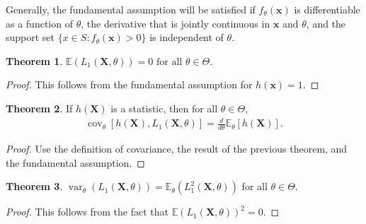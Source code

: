 \documentclass[a4paper,12pt]{article}
\theoremstyle{definition}
\newtheorem{theorem}{Theorem}[section]
\theoremstyle{definition}
\theoremstyle{definition}
\newcommand{\bs}{\boldsymbol}
\newcommand{\var}{\operatorname{var}}
\newcommand{\cov}{\operatorname{cov}}
\begin{document}
    Generally, the fundamental assumption will be satisfied if $f_\theta(\bs{x})$ is differentiable as a function of $\theta$, the derivative that is jointly continuous in $\bs{x}$ and $\theta$, and the support set $\{ x \in S : f_\theta(\bs{x}) > 0 \}$ is independent of $\theta$.
    \begin{theorem}
        $\mathbb{E}(L_1(\bs{X}, \theta)) = 0 \text{ for all } \theta \in \Theta$.
        \begin{proof}
            This follows from the fundamental assumption for $h(\bs{x}) = 1$.
        \end{proof}
    \end{theorem}
    \begin{theorem}
        If $h(\bs{X})$ is a statistic, then for all $\theta \in \Theta$,
        \begin{align*}
            \cov_\theta[h(\bs{X}), L_1(\bs{X}, \theta)] = \frac{d}{d\theta} \mathbb{E}_\theta[h(\bs{X})].
        \end{align*}
        \begin{proof}
            Use the definition of covariance, the result of the previous theorem, and the fundamental assumption.
        \end{proof}
    \end{theorem}
    \begin{theorem}
        $\var_\theta(L_1(\bs{X}, \theta)) = \mathbb{E}_\theta \left( L_1^2 (\bs{X}, \theta) \right)$ for all $\theta \in \Theta$.
        \begin{proof}
            This follows from the fact that $\mathbb{E}(L_1(\bs{X}, \theta))^2 = 0$.
        \end{proof}
    \end{theorem}
\end{document}
